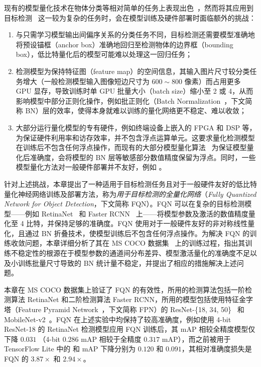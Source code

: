 \documentclass[
  fontset = mac,
]{shtthesis}
\begin{document}
现有的模型量化技术在物体分类等相对简单的任务上表现出色~\citep{zhou2016dorefanet, Zhang_2018, li2019additive}，然而将其应用到目标检测~\citep{zou2019object} 这一较为复杂的任务时，会在模型训练及硬件部署时面临额外的挑战：
\begin{enumerate}[1)]
  \item 与只需学习模型输出间偏序关系的分类任务不同，目标检测还需要模型准确地将预设锚框（anchor box）准确地回归至检测物体的边界框（bounding box），低比特量化后的模型可能难以处理这一回归任务；
  \item 检测模型为保持特征图（feature map）的空间信息，其输入图片尺寸较分类任务增大（一般检测模型输入图像短边尺寸为 $600\sim 800$ 像素）而占用更多 GPU 显存，导致训练时单 GPU 批量大小（batch size）缩小至 2 或 4，从而影响模型中部分正则化操作，例如批正则化（Batch Normalization~\citep{ioffe2015batch}，下文简称 BN）层的效率，使得本身就难以训练的量化网络更不稳定、难以收敛；
  \item 大部分运行量化模型的专有硬件，例如终端设备上嵌入的 FPGA 和 DSP 等，为保证硬件利用率和访存效率，并不包含浮点运算单元。这要求量化检测模型在训练后不包含任何浮点操作，而现有的大部分模型量化算法~\citet{zhou2016dorefanet, Zhang_2018, li2019additive} 为保证模型量化后准确度，会将模型的 BN 层等敏感部分数值精度保留为浮点。同时，一些模型量化方法对一般硬件部署并不友好，例如 \citet{zhu2016trained, cai2017deep}。
\end{enumerate}

针对上述挑战，本章提出了一种适用于目标检测任务且对于一般硬件友好的低比特量化神经网络训练及部署方法，称为\emph{用于目标检测的全量化网络}（\emph{Fully Quantized Network for Object Detection}，下文简称 FQN）。FQN 可以在复杂的目标检测模型——例如 RetinaNet~\citep{lin2017focal} 和 Faster RCNN~\citep{ren2015faster} 上——将模型参数及激活的数值精度量化至 4 比特，并保持足够的准确度。FQN 使用对于一般硬件友好的非对称线性量化，且通过 BN 折叠技术，使模型训练后不包含任何浮点操作。为解决 FQN 的训练收敛问题，本章详细分析了其在 MS COCO 数据集~\citep{lin2014microsoft} 上的训练过程，指出其训练不稳定性的根源在于模型参数的通道间分布差异、模型激活量化的准确度不足以及小训练批量尺寸导致的 BN 统计量不稳定，并提出了相应的措施解决上述问题。

本章在 MS COCO 数据集上验证了 FQN 的有效性，所用的检测算法包括一阶检测算法 RetinaNet 和二阶检测算法 Faster RCNN，所用的模型包括使用特征金字塔（Feature Pyramid Network~\citep{lin2017feature}，下文简称 FPN）的 ResNet-\{18, 34, 50\}~\citep{He_2016} 和 MobileNet-v2~\citep{Sandler_2018}。FQN 在上述实验中均保持了较高准确度，例如使用 4-bit ResNet-18 的 RetinaNet 检测模型应用 FQN 训练后，其 mAP 相较全精度模型仅下降 $0.031$ （4-bit $0.286$ mAP 相较于全精度 $0.317$ mAP），而之前被用于 TensorFlow Lite 中的 \citet{jacob2018quantization} 和 \citet{krishnamoorthi2018quantizing} mAP 下降分别为 $0.120$ 和 $0.091$，其相对准确度损失是 FQN 的 $3.87\times$ 和 $2.94\times$。
\end{document}
